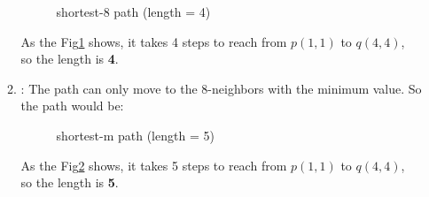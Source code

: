 \documentclass[12pt,a4paper]{article}
\begin{document}
\begin{enumerate}
\begin{enumerate}
\begin{figure}[H]
            \centering
            
            \caption{shortest-8 path (length = 4)}
            \label{fig:2a_s8}
        \end{figure}
        As the Fig\ref{fig:2a_s8} shows, it takes 4 steps to reach from $p(1, 1)$ to $q(4, 4)$,\\ so the length is \textbf{4}.
        \newpage
        \item {}: The path can only move to the 8-neighbors with the minimum value. So the path would be:
        \begin{figure}[H]
            \centering
            
            \caption{shortest-m path (length = 5)}
            \label{fig:2a_sm}
        \end{figure}
        As the Fig\ref{fig:2a_sm} shows, it takes 5 steps to reach from $p(1, 1)$ to $q(4, 4)$,\\ so the length is \textbf{5}.
    \end{enumerate}
\end{enumerate}
\end{document}
